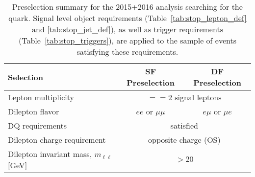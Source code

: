\begin{table}[!htb]
    \begin{center}
        \begin{tabular}{l|c| c}
            \hline
            \hline
            \textbf{Selection} & \textbf{SF Preselection} & \textbf{DF Preselection} \\
            \hline
            Lepton multiplicity & \multicolumn{2}{c}{$==2$ signal leptons} \\
            Dilepton flavor & $ee$ or $\mu \mu$ & $e\mu$ or $\mu e$ \\
            DQ requirements & \multicolumn{2}{c}{satisfied} \\
            Dilepton charge requirement & \multicolumn{2}{c}{opposite charge (OS)} \\
            Dilepton invariant mass, $m_{\ell\ell}$ [GeV] & \multicolumn{2}{c}{$>20$} \\
            \hline
            \hline
        \end{tabular}
        \caption{
            Preselection summary for the 2015+2016 analysis searching for the \stopone quark.
            Signal level object requirements (Table~\ref{tab:stop_lepton_def} and \ref{tab:stop_jet_def}), as well as trigger requirements
            (Table~\ref{tab:stop_triggers}), are applied
            to the sample of events satisfying these requirements.
        }
        \label{tab:stop_preselection}
    \end{center}
\end{table}

